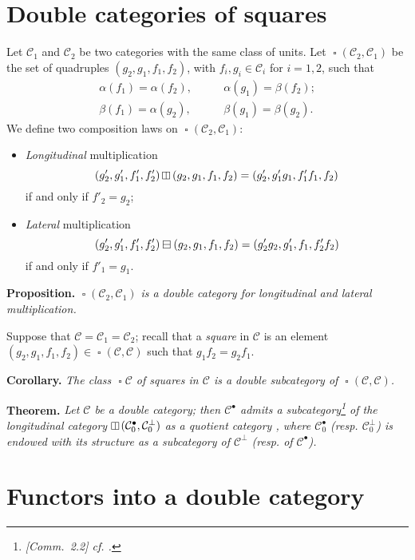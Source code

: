 \documentclass{article}
\newenvironment{itenv}[1]
  {\phantomsection\par\medskip\noindent\textbf{#1.}\itshape}
  {\par\medskip}
\newcommand{\CC}{\mathcal{C}}
\DeclareMathOperator{\sq}{\square}
\DeclareMathOperator{\vsq}{\raisebox{-.1em}{\rotatebox{90}{$\boxminus$}\,}}
\newcommand{\vmult}{\mathbin{\raisebox{-.1em}{\rotatebox{90}{$\boxminus$}}}}
\newcommand{\hmult}{\mathbin{\raisebox{-.05em}{$\boxminus$}}}
\begin{document}
\section{Double categories of squares}

Let $\CC_1$ and $\CC_2$ be two categories with the same class of units.
Let $\sq(\CC_2,\CC_1)$ be the set of quadruples $(g_2,g_1,f_1,f_2)$, with $f_i,g_i\in\CC_i$ for $i=1,2$, such that
\[
  \begin{aligned}
    \alpha(f_1)
    = \alpha(f_2),
    &\qquad
    \alpha(g_1)
    = \beta(f_2);
  \\\beta(f_1)
    = \alpha(g_2),
    &\qquad
    \beta(g_1)
    = \beta(g_2).
  \end{aligned}
\]
We define two composition laws on $\sq(\CC_2,\CC_1)$:
\begin{itemize}
  \item \emph{Longitudinal} multiplication
    \[
      (g'_2,g'_1,f'_1,f'_2)\vmult(g_2,g_1,f_1,f_2)
      = (g'_2,g'_1g_1,f'_1f_1,f_2)
    \]
    if and only if $f'_2=g_2$;
  \item \emph{Lateral} multiplication
    \[
      (g'_2,g'_1,f'_1,f'_2)\hmult(g_2,g_1,f_1,f_2)
      = (g'_2g_2,g'_1,f_1,f'_2f_2)
    \]
    if and only if $f'_1=g_1$.
\end{itemize}

\begin{itenv}{Proposition}
  $\sq(\CC_2,\CC_1)$ is a double category for longitudinal and lateral multiplication.
\end{itenv}

Suppose that $\CC=\CC_1=\CC_2$;
recall \cite{47b,55} that a \emph{square} in $\CC$ is an element $(g_2,g_1,f_1,f_2)\in\sq(\CC,\CC)$ such that $g_1f_2=g_2f_1$.

\begin{itenv}{Corollary}
  The class $\sq\CC$ of squares in $\CC$ is a double subcategory of $\sq(\CC,\CC)$.
\end{itenv}

\begin{itenv}{Theorem}
  Let $\CC$ be a double category;
  then $\CC^\bullet$ admits a subcategory\footnote{\emph{[Comm.~2.2] cf. \cite[Theorem~6]{63}.}} of the longitudinal category $\vsq(\CC_0^\bullet,\CC_0^\perp)$ as a quotient category \cite{47b,55}, where $\CC_0^\bullet$ (resp. $\CC_0^\perp$) is endowed with its structure as a subcategory of $\CC^\perp$ (resp. of $\CC^\bullet$).
\end{itenv}


\section{Functors into a double category}
\end{document}

